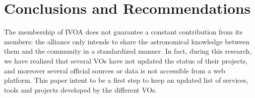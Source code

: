 \section{Conclusions and Recommendations}

The membership of IVOA does not
guarantee a constant contribution from its members: the alliance only 
intends to share the astronomical
knowledge between them and the community in a standardized manner. 
In fact, during this research, we have realized that several VOs have not 
updated the status of their projects, and moreover several official sources 
or data is not accessible from a web platform. This paper intent to be
a first step to keep an updated list of services, tools and projects
developed by the different VOs.


